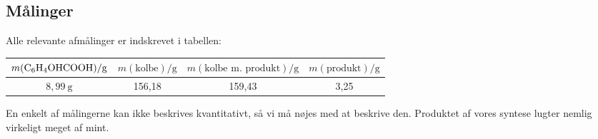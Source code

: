\pagebreak
\subsection*{Målinger}
Alle relevante afmålinger er indskrevet i tabellen:

\begin{table}[h]
    \centering
    \begin{tabular}{|c|c|c|c|}
    \hline
    $m(\ce{C6H4OHCOOH})/\unit{\gram}$
    & $m(\text{kolbe})/\unit{\gram}$ 
    & $m(\text{kolbe m.~produkt})/\unit{\gram}$ & $m(\text{produkt})/\unit{\gram}$ \\ \hline
    $8{,}99\ \unit{\gram}$ & 156{,}18 & 159{,}43 & 3{,}25 \\ \hline
    \end{tabular}
    En enkelt af målingerne kan ikke beskrives kvantitativt,
    så vi må nøjes med at beskrive den. Produktet af vores syntese
    lugter nemlig virkeligt meget af mint.
\end{table}
